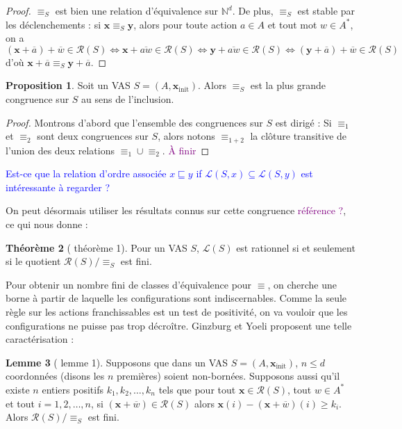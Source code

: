 \documentclass[a4paper,final]{article}
\theoremstyle{definition}
\newtheorem{Theorem}{Théorème}
\newtheorem{Proposition}[Theorem]{Proposition}
\newtheorem{Lemma}[Theorem]{Lemme}
\let\leq\leqslant
\let\geq\geqslant
\newcommand{\alain}[1]{\textcolor{blue}{#1}}
\newcommand{\lucas}[1]{\textcolor{purple}{#1}}
\let\union\cup
\newcommand{\N}{\ensuremath{\mathbb{N}}}
\newcommand{\lang}{\ensuremath{\mathcal{L}}}
\newcommand{\vect}[1]{\ensuremath{\mathbf{#1}}}
\newcommand{\conf}[1]{\ensuremath{\mathcal{R}(#1)}}
\newcommand{\rel}{\ensuremath{\equiv}}
\newcommand{\equivaut}{\ensuremath{\Leftrightarrow}}
\newcommand{\xinit}{\ensuremath{\vect{x}_\text{init}}}
\newcommand{\valeur}[1]{\ensuremath{\overline{#1}}}
\begin{document}
\begin{proof}
$\rel_S$ est bien une relation d'équivalence sur $\N^d$.
De plus, $\rel_S$ est stable par les déclenchements : 
si $\vect{x}\rel_S \vect{y}$, alors pour toute action $a\in A$ et tout mot $w\in A^\ast$, 
on a $$(\vect{x} +\valeur{a}) +\valeur{w} \in\conf{S} 
    \equivaut \vect{x} +\valeur{aw} \in\conf{S}
    \equivaut \vect{y} +\valeur{aw} \in\conf{S}
    \equivaut (\vect{y} +\valeur{a}) +\valeur{w} \in\conf{S}$$
d'où $\vect{x}+\valeur{a} \rel_S \vect{y}+\valeur{a}$.
\end{proof}

\begin{Proposition}
Soit un VAS $S=(A,\xinit)$.
Alors $\rel_S$ est la plus grande congruence sur $S$ au sens de l'inclusion.
\end{Proposition}

\begin{proof}
Montrons d'abord que l'ensemble des congruences sur $S$ est dirigé :
Si $\rel_1$ et $\rel_2$ sont deux congruences sur $S$, alors notons $\rel_{1+2}$ la clôture transitive de l'union des deux relations $\rel_1\union\rel_2$.
\lucas{À finir}

\end{proof}

\alain{Est-ce que la relation d'ordre associée $x \sqsubseteq  y$ if $\lang(S,x) \subseteq \lang(S,y)$ est intéressante à regarder ?}


On peut désormais utiliser les résultats connus sur cette congruence \lucas{référence ?}, ce qui nous donne :

\begin{Theorem}[\cite{giyo80} théorème 1]
    Pour un VAS $S$, $\lang(S)$ est rationnel si et seulement si le quotient $\conf{S}/\rel_S$ est fini.
\end{Theorem}

Pour obtenir un nombre fini de classes d'équivalence pour $\rel$, on cherche une borne à partir de laquelle les configurations sont indiscernables.
Comme la seule règle sur les actions franchissables est un test de positivité, on va vouloir que les configurations ne puisse pas trop décroître.
Ginzburg et Yoeli proposent une telle caractérisation :

\begin{Lemma}[\cite{giyo80} lemme 1]
    Supposons que dans un VAS $S=(A,\xinit)$, $n\leq d$ coordonnées (disons les $n$ premières) soient non-bornées.
    Supposons aussi qu'il existe $n$ entiers positifs $k_1,k_2,\dots,k_n$ tels que pour tout $\vect{x}\in\conf{S}$, tout $w\in A^\ast$ et tout $i=1,2,\dots,n$, 
    si $(\vect{x} +\valeur{w})\in\conf{S}$ alors $\vect{x}(i) - (\vect{x} +\valeur{w})(i)\geq k_i$.
    Alors $\conf{S}/\rel_S$ est fini.
\end{Lemma}
\end{document}
